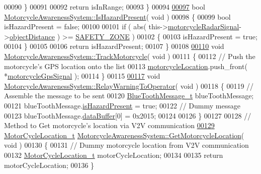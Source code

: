 \begin{DoxyCode}
00090     \}
00091 
00092     \textcolor{keywordflow}{return} isInRange;
00093 \}
00094 
\hypertarget{MotorcycleAwarenessSystem_8cpp_source_l00097}{}\hyperlink{classMotorcycleAwarenessSystem_a35d59c8299b0d5ef43c10306cc7f2ee1}{00097} \textcolor{keywordtype}{bool} \hyperlink{classMotorcycleAwarenessSystem_a35d59c8299b0d5ef43c10306cc7f2ee1}{MotorcycleAwarenessSystem::IsHazardPresent}( \textcolor{keywordtype}{void} )
00098 \{
00099     \textcolor{keywordtype}{bool} isHazardPresent = \textcolor{keyword}{false};
00100 
00101     \textcolor{keywordflow}{if} ( abs( this->\hyperlink{classMotorcycleAwarenessSystem_a0744e71b9f440a86f5078c876ba7629b}{motorcycleRadarSignal}->\hyperlink{structRadarSignal__t_a96938fbfb77f208743a36d3f8b37cccb}{objectDistance} ) >= 
      \hyperlink{classMotorcycleAwarenessSystem_a131c99d85b78020f94fe14bd397f3a6e}{SAFETY\_ZONE} )
00102     \{
00103         isHazardPresent = \textcolor{keyword}{true};
00104     \}
00105 
00106     \textcolor{keywordflow}{return} isHazardPresent;
00107 \}
00108 
\hypertarget{MotorcycleAwarenessSystem_8cpp_source_l00110}{}\hyperlink{classMotorcycleAwarenessSystem_a4e6eec23ec46e24ee377a3c94e15eba4}{00110} \textcolor{keywordtype}{void} \hyperlink{classMotorcycleAwarenessSystem_a4e6eec23ec46e24ee377a3c94e15eba4}{MotorcycleAwarenessSystem::TrackMotorcycle}( \textcolor{keywordtype}{void} )
00111 \{
00112     \textcolor{comment}{// Push the motorcycle's GPS location onto the list}
00113     \hyperlink{classMotorcycleAwarenessSystem_af6becfeb1d11b467cb80a94a8e6940ac}{motorcycleLocation}.push\_front( *\hyperlink{classMotorcycleAwarenessSystem_ab281a3993b574923b2f379ed0477b2d4}{motorcycleGpsSignal} );
00114 \}
00115 
\hypertarget{MotorcycleAwarenessSystem_8cpp_source_l00117}{}\hyperlink{classMotorcycleAwarenessSystem_aec5e4731c6bf0789821ba2793918e3ee}{00117} \textcolor{keywordtype}{void} \hyperlink{classMotorcycleAwarenessSystem_aec5e4731c6bf0789821ba2793918e3ee}{MotorcycleAwarenessSystem::RelayWarningToOperator}( \textcolor{keywordtype}{
      void} )
00118 \{
00119     \textcolor{comment}{// Assemble the message to be sent}
00120     \hyperlink{structBlueToothMessage__t}{BlueToothMessage\_t} blueToothMessage;
00121     blueToothMessage.\hyperlink{structBlueToothMessage__t_a2dd315aa1cba1d2d3045e26b9f171e61}{isHazardPresent} = \textcolor{keyword}{true};
00122     \textcolor{comment}{// Dummy message}
00123     blueToothMessage.\hyperlink{structBlueToothMessage__t_ab872789a32f068dae8bcf77122256b78}{dataBuffer}[0] = 0x2015;
00124 
00126 \}
00127 
00128 \textcolor{comment}{// Method to Get motorcycle's location via V2V communication}
\hypertarget{MotorcycleAwarenessSystem_8cpp_source_l00129}{}\hyperlink{classMotorcycleAwarenessSystem_a840a5bc17d75276ecdb3a39d7aaf4109}{00129} \hyperlink{structMotorCycleLocation__t}{MotorCycleLocation\_t} 
      \hyperlink{classMotorcycleAwarenessSystem_a840a5bc17d75276ecdb3a39d7aaf4109}{MotorcycleAwarenessSystem::GetMotorcycleLocation}( \textcolor{keywordtype}{void} )
00130 \{
00131     \textcolor{comment}{// Dummy motorcycle location from V2V communication}
00132     \hyperlink{structMotorCycleLocation__t}{MotorCycleLocation\_t} motorCycleLocation;
00134 
00135     \textcolor{keywordflow}{return} motorCycleLocation;
00136 \}
\end{DoxyCode}

